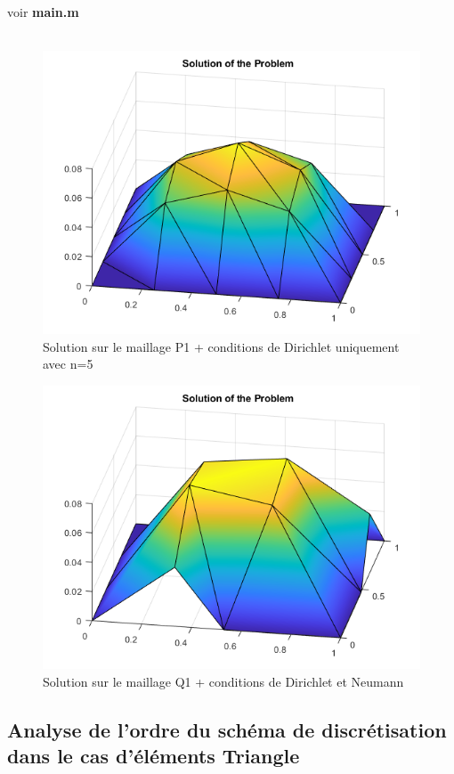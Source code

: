 \documentclass{article}
\begin{document}
voir \textbf{main.m} \\ \\ 
\begin{figure}[H]
\centering
\includegraphics[width=12cm]{P1.png}
\caption{Solution sur le maillage P1 + conditions de Dirichlet uniquement avec n=5}
\end{figure}

\begin{figure}[H]
\centering
\includegraphics[width=12cm]{Q1.png}
\caption{Solution sur le maillage Q1 + conditions de Dirichlet et Neumann}
\end{figure}

\subsection{Analyse de l'ordre du schéma de discrétisation dans le cas d'éléments Triangle}
\end{document}
